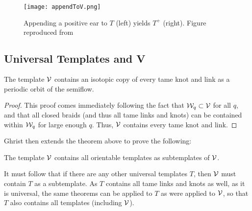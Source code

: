 \documentclass[paper.tex]{subfiles}
\begin{document}
\begin{figure}[h]
    \centering
    \texttt{[image: appendToV.png]}
    \caption{Appending a positive ear to $T$ (left) yields $T^+$ (right). Figure reproduced from~\cite{Ghrist1995}} \label{fig:appendToV} %
\end{figure}




\subsection{Universal Templates and V}

\begin{thm}[Ghrist 1995]
    The template $\mathcal{V}$ contains an isotopic copy of every tame knot and link as a periodic orbit of the semiflow. 
\end{thm}
\begin{proof}
    This proof comes immediately following the fact that $\mathcal{W}_q \subset \mathcal{V}$ for all $q$, and that all closed braids (and thus all tame links and knots) can be contained within $\mathcal{W}_q$ for large enough $q$. Thus, $\mathcal{V}$ contains every tame knot and link. 
\end{proof}


Ghrist then extends the theorem above to prove the following: 

\begin{thm}[Ghrist 1995] 
    The template $\mathcal{V}$ contains all orientable templates as subtemplates of $\mathcal{V}$. 
\end{thm}

It must follow that if there are any other universal templates $T$, then $\mathcal{V}$ must contain $T$ as a subtemplate. As $T$ contains all tame links and knots as well, as it is universal, the same theorems can be applied to $T$ as were applied to $\mathcal{V}$, so that $T$ also contains all templates (including $\mathcal{V}$). 
\end{document}
